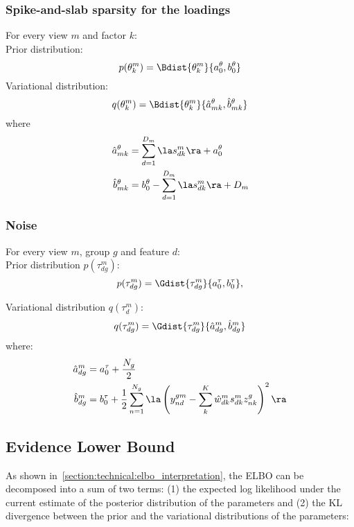 \subsubsection{Spike-and-slab sparsity for the loadings}
For every view $m$ and factor $k$: \\

Prior distribution:
\[
	p(\theta_k^m) = \Bdist{\theta_k^m}{a_0^\theta,b_0^\theta}
\]
Variational distribution:
\begin{equation}
	q(\theta_k^m) = \Bdist{\theta_k^m}{\hat{a}_{mk}^{\theta}, \hat{b}_{mk}^{\theta}}
\end{equation}
where
\begin{equation}
     \begin{aligned}
  	\hat{a}_{mk}^\theta &= \sum_{d=1}^{D_m} \la s^m_{dk}\ra + a_0^\theta\\
  	\hat{b}_{mk}^\theta &= b_0^\theta - \sum_{d=1}^{D_m} \la s^m_{dk}\ra + D_m
     \end{aligned}
\end{equation}


\subsubsection{Noise}
For every view $m$, group $g$ and feature $d$:\\

Prior distribution $p(\tau_{dg}^m)$:
\[
	p(\tau_{dg}^m) = \Gdist{\tau_{dg}^m}{a_0^\tau,b_0^\tau},
\]

Variational distribution $q(\tau_d^m)$:
\begin{equation}
	q(\tau_{dg}^m) = \Gdist{\tau_{dg}^m}{\hat{a}_{dg}^{m} , \hat{b}_{dg}^{m}}
\end{equation}
where:
\begin{equation} \begin{aligned}
	\hat{a}_{dg}^{m} &= a_0^{\tau} + \frac{N_g}{2}\\
	\hat{b}_{dg}^{m} &= b_0^{\tau} + \frac{1}{2} \sum_{n=1}^{N_g}  \la\left(y_{nd}^{gm} - \sum_k^{K} \hat{w}_{dk}^m s_{dk}^m z_{nk}^{g}\right)^2 \ra
\end{aligned} \end{equation}



\subsection{Evidence Lower Bound}
As shown in~\ref{section:technical:elbo_interpretation}, the ELBO can be decomposed into a sum of two terms: (1) the expected log likelihood under the current estimate of the posterior distribution of the parameters and (2) the KL divergence between the prior and the variational distributions of the parameters:\\

